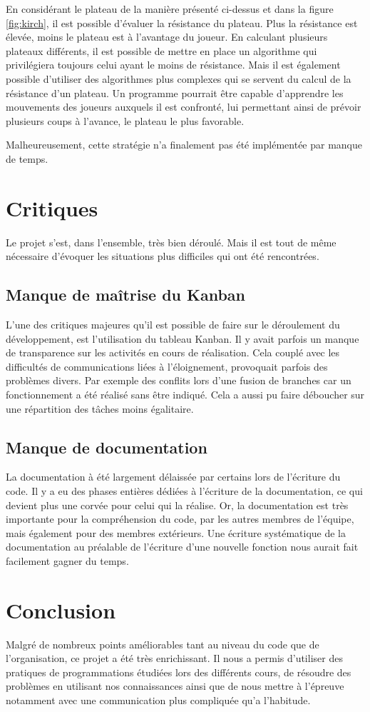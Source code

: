 \documentclass[a4paper, 12pt]{article}
\begin{document}
En considérant le plateau de la manière présenté ci-dessus et dans la figure \ref{fig:kirch}, il est possible d'évaluer la résistance du plateau. Plus la résistance est élevée, moins le plateau est à l'avantage du joueur. En calculant plusieurs plateaux différents, il est possible de mettre en place un algorithme qui privilégiera toujours celui ayant le moins de résistance. Mais il est également possible d'utiliser des algorithmes plus complexes qui se servent du calcul de la résistance d'un plateau. Un programme pourrait être capable d'apprendre les mouvements des joueurs auxquels il est confronté, lui permettant ainsi de prévoir plusieurs coups à l'avance, le plateau le plus favorable.

Malheureusement, cette stratégie n'a finalement pas été implémentée par manque de temps.
\section{Critiques}
Le projet s'est, dans l'ensemble, très bien déroulé. Mais il est tout de même nécessaire d'évoquer les situations plus difficiles qui ont été rencontrées.

\subsection{Manque de maîtrise du Kanban}
L'une des critiques majeures qu'il est possible de faire sur le déroulement du développement, est l'utilisation du tableau Kanban. Il y avait parfois un manque de transparence sur les activités en cours de réalisation. Cela couplé avec les difficultés de communications liées à l'éloignement, provoquait parfois des problèmes divers. Par exemple des conflits lors d'une fusion de branches car un fonctionnement a été réalisé sans être indiqué. Cela a aussi pu faire déboucher sur une répartition des tâches moins égalitaire.

\subsection{Manque de documentation}
La documentation à été largement délaissée par certains lors de l'écriture du code. Il y a eu des phases entières dédiées à l'écriture de la documentation, ce qui devient plus une corvée pour celui qui la réalise. Or, la documentation est très importante pour la compréhension du code, par les autres membres de l'équipe, mais également pour des membres extérieurs. Une écriture systématique de la documentation au préalable de l'écriture d'une nouvelle fonction nous aurait fait facilement gagner du temps.

\section{Conclusion}
Malgré de nombreux points améliorables tant au niveau du code que de l'organisation, ce projet a été très enrichissant. Il nous a permis d'utiliser des pratiques de programmations étudiées lors des différents cours, de résoudre des problèmes en utilisant nos connaissances ainsi que de nous mettre à l'épreuve notamment avec une communication plus compliquée qu'a l'habitude.
\end{document}
